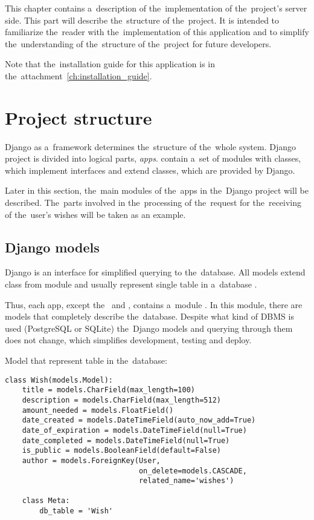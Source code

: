 This chapter contains a~description of the~implementation of the~project's server side. This part will describe
the~structure of the~project. It is intended to familiarize the~reader with the~implementation of this application and
to simplify the~understanding of the~structure of the~project for future developers.

Note that the~installation guide for this application is in the~attachment~\ref{ch:installation_guide}.


\newcommand{\appitem}[1]{
\item\textbf{#1}.}
\newcommand{\setitem}[1]{
\item\textbf{#1}.}
\section{Project structure}
Django as a~framework determines the~structure of the~whole system. Django project is divided into logical parts,
\textit{apps}.  contain a~set of modules with classes, which implement interfaces and extend classes,
which are provided by Django.

Later in this section, the~main modules of the~apps in the~Django project will be described. The~parts involved in
the~processing of the~request for the~receiving of the~user's wishes will be taken as an example.

\subsection{Django models}
Django  is an interface for simplified querying to the~database. All models extend class
 from  module and usually represent single table in a~database \cite{djangodocs}.

Thus, each app, except the~ and , contains a~module . In this module, there
are models that completely describe the~database. Despite what kind of \ac{DBMS} is used (PostgreSQL or SQLite)
the~Django models and querying through them does not change, which simplifies development, testing and deploy.
\pagebreak

Model that represent table  in the~database:
\begin{lstlisting}
class Wish(models.Model):
    title = models.CharField(max_length=100)
    description = models.CharField(max_length=512)
    amount_needed = models.FloatField()
    date_created = models.DateTimeField(auto_now_add=True)
    date_of_expiration = models.DateTimeField(null=True)
    date_completed = models.DateTimeField(null=True)
    is_public = models.BooleanField(default=False)
    author = models.ForeignKey(User,
                               on_delete=models.CASCADE,
                               related_name='wishes')

    class Meta:
        db_table = 'Wish'

\end{lstlisting}

